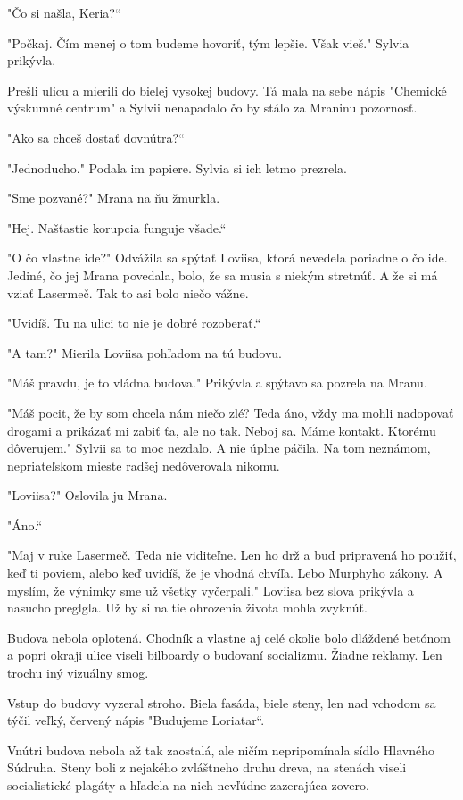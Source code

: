 \documentclass{book}
\begin{document}
"$ $Čo si našla, Keria?“

"$ $Počkaj. Čím menej o tom budeme hovoriť, tým lepšie. Však vieš."$ $ Sylvia prikývla.

Prešli ulicu a mierili do bielej vysokej budovy. Tá mala na sebe nápis "$ $Chemické výskumné centrum"$ $ a Sylvii nenapadalo čo by stálo za Mraninu pozornosť.

"$ $Ako sa chceš dostať dovnútra?“

"$ $Jednoducho."$ $ Podala im papiere. Sylvia si ich letmo prezrela.

"$ $Sme pozvané?"$ $ Mrana na ňu žmurkla.

"$ $Hej. Našťastie korupcia funguje všade.“

"$ $O čo vlastne ide?"$ $ Odvážila sa spýtať Loviisa, ktorá nevedela poriadne o čo ide. Jediné, čo jej Mrana povedala, bolo, že sa musia s niekým stretnúť. A že si má vziať Lasermeč. Tak to asi bolo niečo vážne.

"$ $Uvidíš. Tu na ulici to nie je dobré rozoberať.“

"$ $A tam?"$ $ Mierila Loviisa pohľadom na tú budovu.

"$ $Máš pravdu, je to vládna budova."$ $ Prikývla a spýtavo sa pozrela na Mranu.

"$ $Máš pocit, že by som chcela nám niečo zlé? Teda áno, vždy ma mohli nadopovať drogami a prikázať mi zabiť ťa, ale no tak. Neboj sa. Máme kontakt. Ktorému dôverujem."$ $ Sylvii sa to moc nezdalo. A nie úplne páčila. Na tom neznámom, nepriateľskom mieste radšej nedôverovala nikomu.

"$ $Loviisa?"$ $ Oslovila ju Mrana.

"$ $Áno.“

"$ $Maj v ruke Lasermeč. Teda nie viditeľne. Len ho drž a buď pripravená ho použiť, keď ti poviem, alebo keď uvidíš, že je vhodná chvíľa. Lebo Murphyho zákony. A myslím, že výnimky sme už všetky vyčerpali."$ $ Loviisa bez slova prikývla a nasucho preglgla. Už by si na tie ohrozenia života mohla zvyknúť.

Budova nebola oplotená. Chodník a vlastne aj celé okolie bolo dláždené betónom a popri okraji ulice viseli bilboardy o budovaní socializmu. Žiadne reklamy. Len trochu iný vizuálny smog.

Vstup do budovy vyzeral stroho. Biela fasáda, biele steny, len nad vchodom sa týčil veľký, červený nápis "$ $Budujeme Loriatar“.

Vnútri budova nebola až tak zaostalá, ale ničím nepripomínala sídlo Hlavného Súdruha. Steny boli z nejakého zvláštneho druhu dreva, na stenách viseli socialistické plagáty a hľadela na nich nevľúdne zazerajúca zovero.
\end{document}
